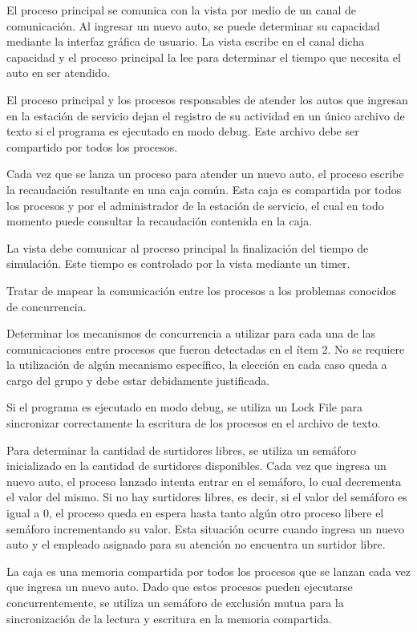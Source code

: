 \documentclass[12pt,a4paper,titlepage,oneside]{article}
\renewenvironment{itemize}{
 \begin{list}{}{
  \setlength{\leftmargin}{1.5em}
 }
}{
 \end{list}
}
\begin{document}
\begin{enumerate}
\begin{itemize}
\item[•] El proceso principal se comunica con la vista por medio de un canal de comunicación. Al ingresar un nuevo auto, se puede determinar su capacidad mediante la interfaz gráfica de usuario. La vista escribe en el canal dicha capacidad y el proceso principal la lee para determinar el tiempo que necesita el auto en ser atendido.
\item[•] El proceso principal y los procesos responsables de atender los autos que ingresan en la estación de servicio dejan el registro de su actividad en un único archivo de texto si el programa es ejecutado en modo debug. Este archivo debe ser compartido por todos los procesos.
\item[•] Cada vez que se lanza un proceso para atender un nuevo auto, el proceso escribe la recaudación resultante en una caja común. Esta caja es compartida por todos los procesos y por el administrador de la estación de servicio, el cual en todo momento puede consultar la recaudación contenida en la caja.
\item[•] La vista debe comunicar al proceso principal la finalización del tiempo de simulación. Este tiempo es controlado por la vista mediante un timer.
\end{itemize}

\item Tratar de mapear la comunicación entre los procesos a los problemas conocidos de concurrencia.

\item Determinar los mecanismos de concurrencia a utilizar para cada una de las comunicaciones entre procesos que fueron detectadas en el ítem 2. No se requiere la utilización de algún mecanismo específico, la elección en cada caso queda a cargo del grupo y debe estar debidamente justificada.

\begin{itemize}
\item[•] Si el programa es ejecutado en modo debug, se utiliza un Lock File para sincronizar correctamente la escritura de los procesos en el archivo de texto.
\item[•] Para determinar la cantidad de surtidores libres, se utiliza un semáforo inicializado en la cantidad de surtidores disponibles. Cada vez que ingresa un nuevo auto, el proceso lanzado intenta entrar en el semáforo, lo cual decrementa el valor del mismo. Si no hay surtidores libres, es decir, si el valor del semáforo es igual a 0, el proceso queda en espera hasta tanto algún otro proceso libere el semáforo incrementando su valor. Esta situación ocurre cuando ingresa un nuevo auto y el empleado asignado para su atención no encuentra un surtidor libre.
\item[•] La caja es una memoria compartida por todos los procesos que se lanzan cada vez que ingresa un nuevo auto. Dado que estos procesos pueden ejecutarse concurrentemente, se utiliza un semáforo de exclusión mutua para la sincronización de la lectura y escritura en la memoria compartida.
\end{itemize}
\end{enumerate}
\end{document}
